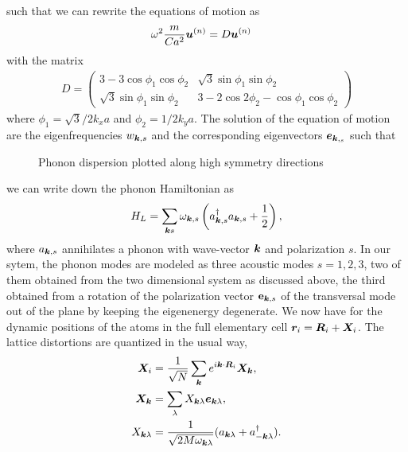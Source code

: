 \documentclass[aps,prl,twocolumn,superscriptaddress,amsmath,amssymb,floats,aps,10pt]{revtex4-1}
\begin{document}
such that we can rewrite the equations of motion as
\begin{subequations}
 \begin{align}
   \omega^2 \frac{m}{Ca^2} \bm u^{(n)}&=D\bm u^{(n)}
 \end{align}
\end{subequations}
with the matrix
\begin{align}
 {D}=\left(\begin{array}{cc}
          3-3\cos\phi_1\cos\phi_2 &\sqrt{3}\sin \phi_1\sin\phi_2\\
          \sqrt{3}\sin \phi_1\sin\phi_2&3-2\cos 2\phi_2 -\cos\phi_1\cos\phi_2
         \end{array}\right)
\end{align}
where $\phi_1=\sqrt 3/2 k_x a$ and $\phi_2=1/2 k_y a$. The solution of the equation of motion are the eigenfrequencies $w_{\bm{k},s}$ and the corresponding
eigenvectors $\bm e_{\bm{k},_s}$ such that
 \begin{figure}[tb]
 \caption{Phonon dispersion plotted along high symmetry directions\cite{Martinsson03}}
 \label{fig_phonon_spectrum_hex}
 \end{figure}
we can write down the phonon Hamiltonian as
 \begin{equation}
{H}_{L} =   \sum_{ \bm{k}  s } \omega_{\bm{k},s } \left( a^{\dagger}_{ \bm{k}, s}
 a_{\bm{k}, s} + \frac{1}{2} \right),
 \label{eq:Hp}
 \end{equation}
where $a_{\bm{k},s}$ annihilates a phonon with wave-vector $\bm{k}$ and
polarization $s$.
In our sytem, the phonon modes are modeled as three acoustic modes $s=1,2,3$, two of them obtained from the two
dimensional system as discussed above, the third obtained from a rotation of the polarization vector ${\bf e}_{\bm k,s}$ of the transversal mode out of the plane by keeping
the eigenenergy degenerate.
We now have for the dynamic positions of the atoms in the full elementary cell ${\bm{r}}_i = \bm{R}_i + \bm{X}_i$.
The lattice distortions are quantized in the usual way,
 \begin{subequations}
 \begin{align}
 \bm{X}_i & =  \frac{1}{\sqrt{N}} \sum_{\bm{k}} e^{ i \bm{k} \cdot \bm{R}_i } 
 \bm{X}_{\bm{k}},
 \\
 \bm{X}_{\bm{k}} & =  \sum_{\lambda} X_{ \bm{k} \lambda } \bm{e}_{ \bm{k} \lambda } ,
 \\
  X_{ \bm{k} \lambda } & =   \frac{1}{ \sqrt{2 M \omega_{\bm{k} \lambda }} }
 ( a_{ \bm{k} \lambda } +  a_{ -\bm{k} \lambda }^{\dagger} ).
 \label{eq_phononop}
 \end{align}
\end{subequations}
\end{document}
